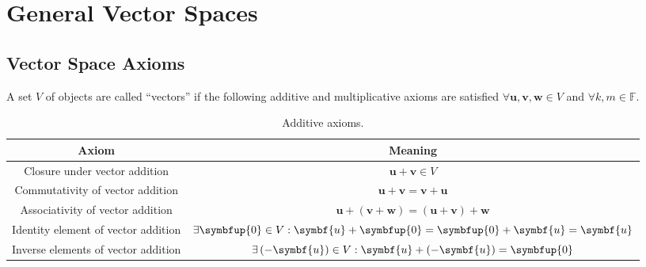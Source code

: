 \documentclass{article}
\begin{document}
\section{General Vector Spaces}
\subsection{Vector Space Axioms}
A set \(V\) of objects are called ``vectors'' if the following additive
and multiplicative axioms are satisfied \(\forall \symbf{u}, \symbf{v},
\symbf{w} \in V\) and \(\forall k, m \in \mathbb{F}\).
\begin{table}[H]
    \centering
    \begin{tabular}{c c}
        \toprule
        \textbf{Axiom}                      & \textbf{Meaning}                                                                                        \\
        \midrule
        Closure under vector addition       & \(\symbf{u} + \symbf{v} \in V\)                                                                         \\
        Commutativity of vector addition    & \(\symbf{u} + \symbf{v} = \symbf{v} + \symbf{u}\)                                                       \\
        Associativity of vector addition    & \(\symbf{u} + \left( \symbf{v} + \symbf{w} \right) = \left( \symbf{u} + \symbf{v} \right) + \symbf{w}\) \\
        Identity element of vector addition & \(\exists \symbfup{0} \in V : \symbf{u} + \symbfup{0} = \symbfup{0} + \symbf{u} = \symbf{u}\)           \\
        Inverse elements of vector addition & \(\exists \left( -\symbf{u} \right) \in V : \symbf{u} + \left( -\symbf{u} \right) = \symbfup{0}\)       \\
        \bottomrule
    \end{tabular}
    \caption{Additive axioms.} %
\end{table}
\end{document}
